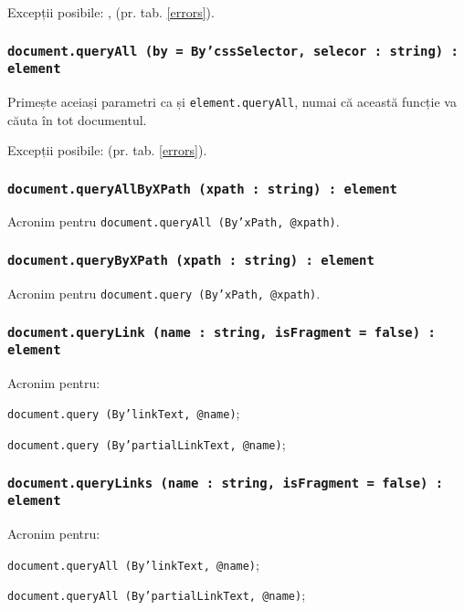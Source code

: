 Excepții posibile: ,  (pr. tab. \ref{errors}).

\subsubsection{\texttt{document.queryAll (by = By'cssSelector, selecor : string) : element}}

Primește aceiași parametri ca și \texttt{element.queryAll}, numai că această funcție va căuta în tot documentul.

Excepții posibile:  (pr. tab. \ref{errors}).

\subsubsection{\texttt{document.queryAllByXPath (xpath : string) : element}}

Acronim pentru \texttt{document.queryAll (By'xPath, @xpath)}.

\subsubsection{\texttt{document.queryByXPath (xpath : string) : element}}

Acronim pentru \texttt{document.query (By'xPath, @xpath)}.

\subsubsection{\texttt{document.queryLink (name : string, isFragment = false) : element}}

Acronim pentru:
\begin{icItems}
	\item \texttt{document.query (By'linkText, @name)};
	\item \texttt{document.query (By'partialLinkText, @name)};
\end{icItems}

\subsubsection{\texttt{document.queryLinks (name : string, isFragment = false) : element}}

Acronim pentru:
\begin{icItems}
	\item \texttt{document.queryAll (By'linkText, @name)};
	\item \texttt{document.queryAll (By'partialLinkText, @name)};
\end{icItems}

